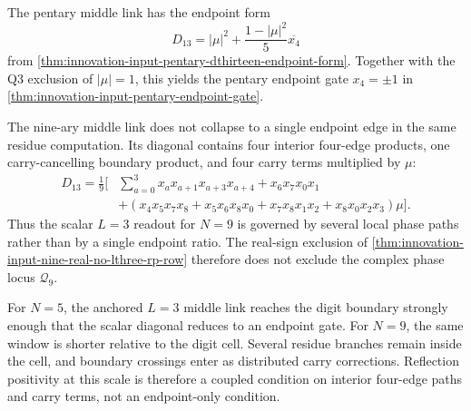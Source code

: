 \begin{principle}
\label{prin:innovation-input-nine-complex-multiedge-readout}
The pentary middle link has the endpoint form
$$
D_{13}
=
|\mu|^2+\frac{1-|\mu|^2}{5}\overline{x_4}
$$
from
\autoref{thm:innovation-input-pentary-dthirteen-endpoint-form}. Together
with the Q3 exclusion of $|\mu|=1$, this yields the pentary endpoint gate
$x_4=\pm1$ in
\autoref{thm:innovation-input-pentary-endpoint-gate}.

The nine-ary middle link does not collapse to a single endpoint edge in
the same residue computation. Its diagonal contains four interior
four-edge products, one carry-cancelling boundary product, and four
carry terms multiplied by $\mu$:
$$
\begin{aligned}
D_{13}
=
\frac19\Big[
&\sum_{a=0}^{3}x_ax_{a+1}x_{a+3}x_{a+4}
+
x_6x_7x_0x_1\\
&+
\left(
x_4x_5x_7x_8
+
x_5x_6x_8x_0
+
x_7x_8x_1x_2
+
x_8x_0x_2x_3
\right)\mu
\Big].
\end{aligned}
$$
Thus the scalar $L=3$ readout for $N=9$ is governed by several local
phase paths rather than by a single endpoint ratio. The real-sign
exclusion of
\autoref{thm:innovation-input-nine-real-no-lthree-rp-row} therefore does
not exclude the complex phase locus $\mathcal Q_9$.
\end{principle}

\begin{principle}
\label{prin:innovation-input-nine-complex-cell-scale-interpretation}
For $N=5$, the anchored $L=3$ middle link reaches the digit boundary
strongly enough that the scalar diagonal reduces to an endpoint gate. For
$N=9$, the same window is shorter relative to the digit cell. Several
residue branches remain inside the cell, and boundary crossings enter as
distributed carry corrections. Reflection positivity at this scale is
therefore a coupled condition on interior four-edge paths and carry
terms, not an endpoint-only condition.
\end{principle}
